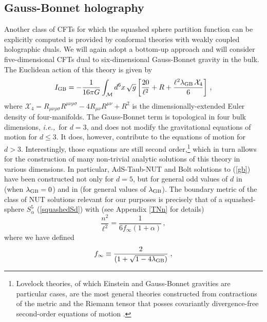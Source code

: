 \documentclass[12pt]{article}
\numberwithin{equation}{section}
\newcommand{\req}[1]{(\ref{#1})} %
\newcommand{\ie}{{\it i.e.,}\ }
\begin{document}
\subsection{Gauss-Bonnet holography}
\label{hd}

Another class of CFTs for which the squashed sphere partition function can be explicitly computed is provided by conformal theories with weakly coupled holographic duals. We will again adopt a bottom-up approach and will consider five-dimensional CFTs dual to six-dimensional Gauss-Bonnet gravity in the bulk. The Euclidean action of this theory is given by
%
\begin{equation}\label{gb}
I_{\rm GB}= -\frac{1}{16\pi G}\int_{\mathcal{M}}d^{6}x\, \sqrt{g} \left[\frac{20}{\ell^2}+R+\frac{\ell^2 \lambda_{\rm GB}\,\mathcal{X}_4}{6} \right]\, ,
\end{equation}
%
where $\mathcal{X}_4=R_{\mu\nu\rho\sigma}R^{\mu\nu\rho\sigma}-4R_{\mu\nu}R^{\mu\nu}+R^2$ is the dimensionally-extended Euler density of four-manifolds. The Gauss-Bonnet term is topological in four bulk dimensions, \ie for $d=3$,  and does not modify the gravitational equations of motion for $d\leq 3$. It does, however, contribute to the equations of motion for $d>3$. Interestingly, those equations are still second order,\footnote{Lovelock theories, of which Einstein and Gauss-Bonnet gravities are particular cases, are the most general theories constructed from contractions of the metric and the Riemann tensor that posses covariantly divergence-free second-order equations of motion \cite{Lovelock2}.} which in turn allows for the construction of many non-trivial analytic solutions of this theory in various dimensions.  In particular, AdS-Taub-NUT and Bolt solutions to \req{gb} have been constructed not only for $d=5$, but for general odd values of $d$ in \cite{Awad:2000gg}  (when $\lambda_{\rm GB}=0$) and in \cite{Dehghani:2005zm} (for general values of $\lambda_{\rm GB}$). The boundary metric of the class of NUT solutions relevant for our purposes is precisely that of a squashed-sphere $S^5_{\alpha}$ \req{squashedSd} with (see Appendix \ref{TNn} for details)
%
\begin{equation}\label{sqgb}
\frac{n^2}{\ell^2}=\frac{1}{6f_{\infty}(1+\alpha)}\, , 
\end{equation}
%
where we have defined
%
\begin{equation}\label{finfdef}
f_{\infty}\equiv \frac{2}{(1+\sqrt{1-4\lambda_{\rm GB}})}\;,
\end{equation}
\end{document}
